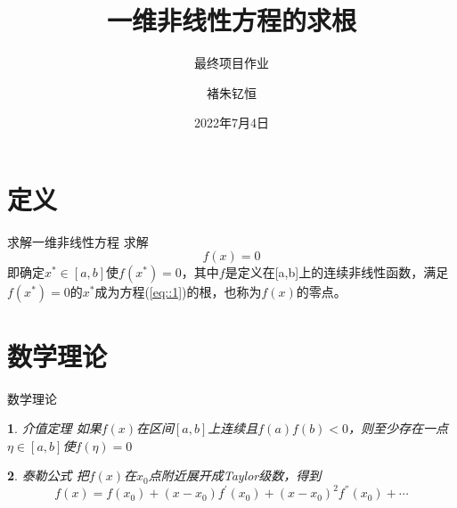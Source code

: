 \documentclass{beamer}
\author{褚朱钇恒}
\title{一维非线性方程的求根}
\subtitle{最终项目作业}
\institute{数学软件}
\date{2022年7月4日}
\newtheorem*{inner}{\innerheader}
\newcommand{\innerheader}{}
\renewenvironment{theorem}
 {\renewcommand\innerheader{定理\,\stepcounter{theorem}\thetheorem}\begin{inner}}
 {\end{inner}}
\begin{document}
\kaishu
\begin{frame}
    \titlepage
\end{frame}

\begin{frame}
    \tableofcontents[sectionstyle=show,subsectionstyle=show/shaded/hide,subsubsectionstyle=show/shaded/hide]
\end{frame}
\section{定义}
\begin{frame}{求解一维非线性方程}
    求解
    \begin{equation}
        f(x)=0
        \label{eq::1}
   \end{equation}
   即确定$x^*\in[a,b]$使$f(x^*)=0$，其中$f$是定义在[a,b]上的连续非线性函数，满足$f(x^*)=0$的$x^*$成为方程(\ref{eq::1})的根，也称为$f(x)$的零点。
\end{frame}

\section{数学理论}
\begin{frame}{数学理论\cite{mathematical_analysis}}
    \begin{theorem}{介值定理}
        \label{the::intermediate}
        如果$f(x)$在区间$[a,b]$上连续且$f(a)f(b)<0$，则至少存在一点$\eta\in[a,b]$使$f(\eta)=0$

   \end{theorem}
   \begin{theorem}{泰勒公式}
        \label{the::taylor}
        把$f(x)$在$x_0$点附近展开成Taylor级数，得到
        $$f(x)=f(x_0)+(x-x_0)f^{'}(x_0)+(x-x_0)^2f^{''}(x_0)+\cdots$$
   \end{theorem}
\end{frame}
\end{document}
